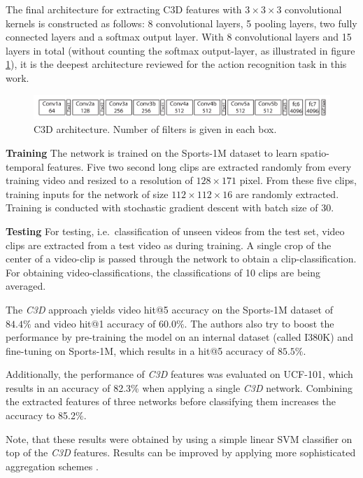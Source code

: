 The final architecture for extracting C3D features with $3\times3\times3$ convolutional kernels is constructed as follows:
8 convolutional layers, 5 pooling layers, two fully connected layers and a softmax output layer.
With 8 convolutional layers and 15 layers in total (without counting the softmax output-layer, as illustrated in figure \ref{fig:c3d_architecture}), it is the deepest architecture reviewed for the action recognition task in this work.
\begin{figure}[H]
    \centering
    \includegraphics[width=\textwidth]{img_deep/c3d_architecture}
    \caption{C3D architecture. Number of filters is given in each box. \cite{tran_learning_2015}}
    \label{fig:c3d_architecture}
\end{figure}

\textbf{Training} The network is trained on the Sports-1M \cite{karpathy_large-scale_2014} dataset to learn spatio-temporal features.
Five two second long clips are extracted randomly from every training video and resized to a resolution of $128\times171$ pixel.
From these five clips, training inputs for the network of size $112\times112\times16$ are randomly extracted.
Training is conducted with stochastic gradient descent with batch size of 30.

\textbf{Testing} For testing, i.e.\ classification of unseen videos from the test set, video clips are extracted from a test video as during training.
A single crop of the center of a video-clip is passed through the network to obtain a clip-classification.
For obtaining video-classifications, the classifications of 10 clips are being averaged.

The \textit{C3D} approach yields video hit@5 accuracy on the Sports-1M dataset of $84.4\%$ and video hit@1 accuracy of $60.0\%$.
The authors also try to boost the performance by pre-training the model on an internal dataset (called I380K) and fine-tuning on Sports-1M, which results in a hit@5 accuracy of $85.5\%$.

Additionally, the performance of \textit{C3D} features was evaluated on UCF-101, which results in an accuracy of 82.3\% when applying a single \textit{C3D} network.
Combining the extracted features of three networks before classifying them increases the accuracy to 85.2\%.

Note, that these results were obtained by using a simple linear SVM classifier on top of the \textit{C3D} features.
Results can be improved by applying more sophisticated aggregation schemes \cite{tran_learning_2015}.

